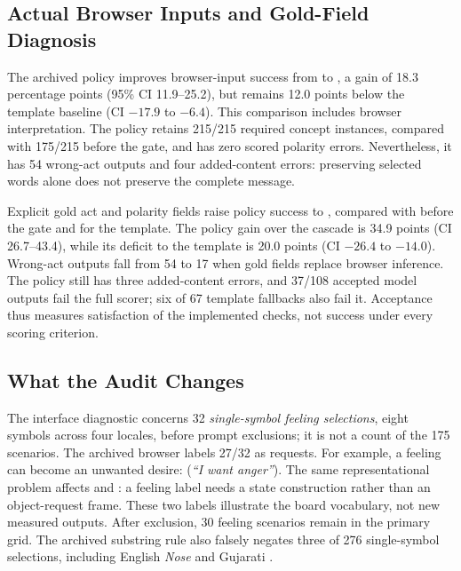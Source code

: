 

\subsection{Actual Browser Inputs and Gold-Field Diagnosis}
The archived policy improves browser-input success from \WebCascade{} to \WebPolicy{}, a gain of 18.3 percentage points (95\% CI 11.9--25.2), but remains 12.0 points below the template baseline (CI $-17.9$ to $-6.4$).
This comparison includes browser interpretation.
The policy retains 215/215 required concept instances, compared with 175/215 before the gate, and has zero scored polarity errors.
Nevertheless, it has 54 wrong-act outputs and four added-content errors: preserving selected words alone does not preserve the complete message.

Explicit gold act and polarity fields raise policy success to \GoldPolicy{}, compared with \GoldCascade{} before the gate and \GoldTemplate{} for the template.
The policy gain over the cascade is 34.9 points (CI 26.7--43.4), while its deficit to the template is 20.0 points (CI $-26.4$ to $-14.0$).
Wrong-act outputs fall from 54 to 17 when gold fields replace browser inference.
The policy still has three added-content errors, and 37/108 accepted model outputs fail the full scorer; six of 67 template fallbacks also fail it.
Acceptance thus measures satisfaction of the implemented checks, not success under every scoring criterion.

\subsection{What the Audit Changes}
The interface diagnostic concerns 32 \emph{single-symbol feeling selections}, eight symbols across four locales, before prompt exclusions; it is not a count of the 175 scenarios.
The archived browser labels 27/32 as requests.
For example, a feeling can become an unwanted desire:   (\emph{``I want anger''}).
The same representational problem affects   and  : a feeling label needs a state construction rather than an object-request frame.
These two labels illustrate the board vocabulary, not new measured outputs.
After exclusion, 30 feeling scenarios remain in the primary grid.
The archived substring rule also falsely negates three of 276 single-symbol selections, including English \emph{Nose} and Gujarati .

